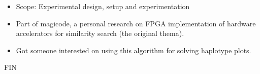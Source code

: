 \documentclass{beamer}
\begin{document}
\begin{frame}
\begin{itemize}
    \item Scope: Experimental design, setup and experimentation
    \item Part of magicode, a personal research on FPGA implementation of hardware accelerators for similarity search (the original thema).
    \item Got someone interested on using this algorithm for solving haplotype plots.
\end{itemize}
\end{frame}
  
\begin{frame}
\centering
		FIN
\end{frame}
\end{document}
